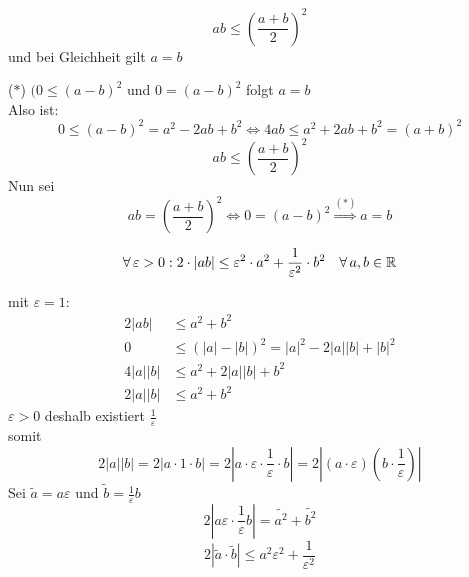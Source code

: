 \documentclass[../ana1u.tex]{subfiles}
\begin{document}
\begin{kor}
    \[ab \leq \left(\frac{a+b}{2}\right)^2\]
    und bei Gleichheit gilt \(a = b\)
\end{kor}
\begin{bew}
    (\(\ast\)) \((0 \leq (a-b)^2\) und \(0 = (a-b)^2\) folgt \(a = b\)\\
    Also ist:
    \[0 \leq (a-b)^2 = a^2 - 2ab + b^2 \Leftrightarrow 4ab \leq a^2 +2ab + b^2 = (a+b)^2\]
    \[ab \leq \left(\frac{a+b}{2}\right)^2\]
    Nun sei
    \[ab = \left(\frac{a+b}{2}\right)^2 \Leftrightarrow 0 = (a-b)^2 \overset{(\ast)}{\Rightarrow} a = b\]
\end{bew}
\begin{satz}
    \[\forall \, \varepsilon > 0: 2 \cdot |ab| \leq \varepsilon^2 \cdot a^2 + \frac{1}{\varepsilon^2} \cdot b^2 \quad \forall \, a,b \in \mathbb{R}\]
\end{satz}
\begin{bew}
    mit \(\varepsilon = 1\):\\
    \begin{align*}
        2|ab| &\leq a^2 + b^2\\
        0 &\leq (|a| - |b|)^2 = |a|^2 - 2|a||b| + |b|^2\\
        4|a||b| &\leq a^2 + 2|a||b| + b^2\\
        2|a||b| &\leq a^2 + b^2
    \end{align*}
    \(\varepsilon > 0\) deshalb existiert \(\frac{1}{\varepsilon}\)\\
    somit 
    \[2|a||b| = 2|a \cdot 1 \cdot b| = 2|a \cdot \varepsilon \cdot \frac{1}{\varepsilon} \cdot b| = 2|(a \cdot \varepsilon)(b \cdot \frac{1}{\varepsilon})|\]
    Sei \(\tilde{a} = a\varepsilon\) und \(\tilde{b} = \frac{1}{\varepsilon}b\)
    \[2\left|a\varepsilon \cdot \frac{1}{\varepsilon}b\right| = \tilde{a^2} + \tilde{b^2}\]
    \[2|\tilde{a} \cdot \tilde{b}| \leq a^2\varepsilon^2 + \frac{1}{\varepsilon^2}\] 
\end{bew}
\end{document}
